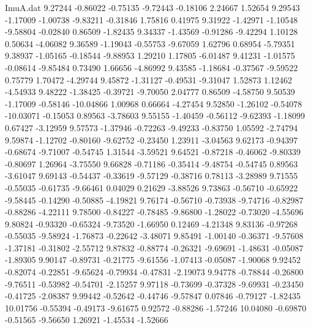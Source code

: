 \begin{filecontents}{ImuA.dat}
   9.27244   -0.86022   -0.75135   -9.72443   -0.18106    2.24667    1.52654
   9.29543   -1.17009   -1.00738   -9.83211   -0.31846    1.75816    0.41975
   9.31922   -1.42971   -1.10548   -9.58804   -0.02840    0.86509   -1.82435
   9.34337   -1.43569   -0.91286   -9.42294    1.10128    0.50634   -4.06082
   9.36589   -1.19043   -0.55753   -9.67059    1.62796    0.68954   -5.79351
   9.38937   -1.05165   -0.18544   -9.88953    1.29210    1.17805   -6.01487
   9.41231   -1.01575   -0.08614   -9.85484    0.73490    1.66656   -4.86992
   9.43585   -1.18684   -0.37567   -9.59522    0.75779    1.70472   -4.29744
   9.45872   -1.31127   -0.49531   -9.31047    1.52873    1.12462   -4.54933
   9.48222   -1.38425   -0.39721   -9.70050    2.04777    0.86509   -4.58750
   9.50539   -1.17009   -0.58146  -10.04866    1.00968    0.66664   -4.27454
   9.52850   -1.26102   -0.54078  -10.03071   -0.15053    0.89563   -3.78603
   9.55155   -1.40459   -0.56112   -9.62393   -1.18099    0.67427   -3.12959
   9.57573   -1.37946   -0.72263   -9.49233   -0.83750    1.05592   -2.74794
   9.59874   -1.12702   -0.80160   -9.62752   -0.23450    1.23911   -3.04563
   9.62173   -0.94397   -0.68674   -9.71007   -0.54745    1.31544   -3.59521
   9.64521   -0.87218   -0.46062   -9.80339   -0.80697    1.26964   -3.75550
   9.66828   -0.71186   -0.35414   -9.48754   -0.54745    0.89563   -3.61047
   9.69143   -0.54437   -0.33619   -9.57129   -0.38716    0.78113   -3.28989
   9.71555   -0.55035   -0.61735   -9.66461    0.04029    0.21629   -3.88526
   9.73863   -0.56710   -0.65922   -9.58445   -0.14290   -0.50885   -4.19821
   9.76174   -0.56710   -0.73938   -9.74716   -0.82987   -0.88286   -4.22111
   9.78500   -0.84227   -0.78485   -9.86800   -1.28022   -0.73020   -4.55696
   9.80824   -0.93320   -0.65324   -9.73520   -1.66950    0.12469   -4.21348
   9.83136   -0.97268   -0.55035   -9.58924   -1.76873   -0.22642   -3.48071
   9.85491   -1.00140   -0.36371   -9.57608   -1.37181   -0.31802   -2.55712
   9.87832   -0.88774   -0.26321   -9.69691   -1.48631   -0.05087   -1.89305
   9.90147   -0.89731   -0.21775   -9.61556   -1.07413   -0.05087   -1.90068
   9.92452   -0.82074   -0.22851   -9.65624   -0.79934   -0.47831   -2.19073
   9.94778   -0.78844   -0.26800   -9.76511   -0.53982   -0.54701   -2.15257
   9.97118   -0.73699   -0.37328   -9.69931   -0.23450   -0.41725   -2.08387
   9.99442   -0.52642   -0.44746   -9.57847    0.07846   -0.79127   -1.82435
  10.01756   -0.55394   -0.49173   -9.61675    0.92572   -0.88286   -1.57246
  10.04080   -0.69870   -0.51565   -9.56650    1.26921   -1.45534   -1.52666

\end{filecontents}
